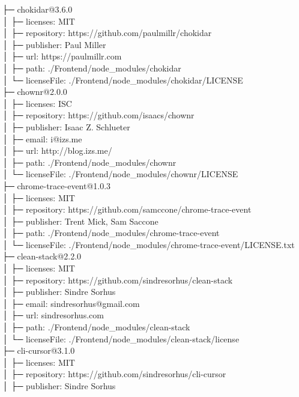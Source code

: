 ├─ chokidar@3.6.0\\
│  ├─ licenses: MIT\\
│  ├─ repository: https://github.com/paulmillr/chokidar\\
│  ├─ publisher: Paul Miller\\
│  ├─ url: https://paulmillr.com\\
│  ├─ path: ./Frontend/node\_modules/chokidar\\
│  └─ licenseFile: ./Frontend/node\_modules/chokidar/LICENSE\\
├─ chownr@2.0.0\\
│  ├─ licenses: ISC\\
│  ├─ repository: https://github.com/isaacs/chownr\\
│  ├─ publisher: Isaac Z. Schlueter\\
│  ├─ email: i@izs.me\\
│  ├─ url: http://blog.izs.me/\\
│  ├─ path: ./Frontend/node\_modules/chownr\\
│  └─ licenseFile: ./Frontend/node\_modules/chownr/LICENSE\\
├─ chrome-trace-event@1.0.3\\
│  ├─ licenses: MIT\\
│  ├─ repository: https://github.com/samccone/chrome-trace-event\\
│  ├─ publisher: Trent Mick, Sam Saccone\\
│  ├─ path: ./Frontend/node\_modules/chrome-trace-event\\
│  └─ licenseFile: ./Frontend/node\_modules/chrome-trace-event/LICENSE.txt\\
├─ clean-stack@2.2.0\\
│  ├─ licenses: MIT\\
│  ├─ repository: https://github.com/sindresorhus/clean-stack\\
│  ├─ publisher: Sindre Sorhus\\
│  ├─ email: sindresorhus@gmail.com\\
│  ├─ url: sindresorhus.com\\
│  ├─ path: ./Frontend/node\_modules/clean-stack\\
│  └─ licenseFile: ./Frontend/node\_modules/clean-stack/license\\
├─ cli-cursor@3.1.0\\
│  ├─ licenses: MIT\\
│  ├─ repository: https://github.com/sindresorhus/cli-cursor\\
│  ├─ publisher: Sindre Sorhus\\
